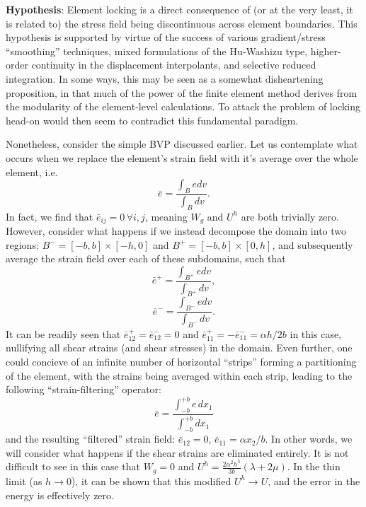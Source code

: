 \documentclass[11pt]{article} %
\begin{document}
\textbf{Hypothesis}: Element locking is a direct consequence of (or at the very least, it is related to) the stress field being discontinuous across element boundaries. This hypothesis is supported by virtue of the success of various gradient/stress ``smoothing'' techniques, mixed formulations of the Hu-Washizu type, higher-order continuity in the displacement interpolants, and selective reduced integration. In some ways, this may be seen as a somewhat disheartening proposition, in that much of the power of the finite element method derives from the modularity of the element-level calculations. To attack the problem of locking head-on would then seem to contradict this fundamental paradigm.

Nonetheless, consider the simple BVP discussed earlier. Let us contemplate what occurs when we replace the element's strain field with it's average over the whole element, i.e.
\begin{equation}
	\bar{e} = \frac{\int_B e dv}{\int_B dv}.
\end{equation}
In fact, we find that $\bar{e}_{ij} = 0 \, \forall i,j$, meaning $W_g$ and $U^h$ are both trivially zero. However, consider what happens if we instead decompose the domain into two regions: $B^- = [-b, b] \times [-h, 0]$ and $B^+ = [-b, b] \times [0, h]$, and subsequently average the strain field over each of these subdomains, such that
\begin{equation}
	\bar{e}^+ = \frac{\int_{B^+} e dv}{\int_{B^+} dv},
\end{equation}
\begin{equation}
	\bar{e}^- = \frac{\int_{B^-} e dv}{\int_{B^-} dv}.
\end{equation}
It can be readily seen that $\bar{e}^+_{12} = \bar{e}^-_{12} = 0$ and $\bar{e}^+_{11} = - \bar{e}^-_{11} = \alpha h / 2 b$ in this case, nullifying all shear strains (and shear stresses) in the domain. Even further, one could concieve of an infinite number of horizontal ``strips'' forming a partitioning of the element, with the strains being averaged within each strip, leading to the following ``strain-filtering'' operator:
\begin{equation}
	\bar{e} = \frac{\int_{-b}^{+b} e \, dx_1}{\int_{-b}^{+b} dx_1}
\end{equation}
and the resulting ``filtered'' strain field: $\bar{e}_{12} = 0$, $\bar{e}_{11} = \alpha x_2 / b$. In other words, we will consider what happens if the shear strains are eliminated entirely. It is not difficult to see in this case that $W_g = 0$ and $U^h = \frac{2 \alpha^2 h^3}{3 b} (\lambda + 2 \mu)$. In the thin limit (as $h \rightarrow 0$), it can be shown that this modified $U^h \rightarrow U$, and the error in the energy is effectively zero.
\end{document}

